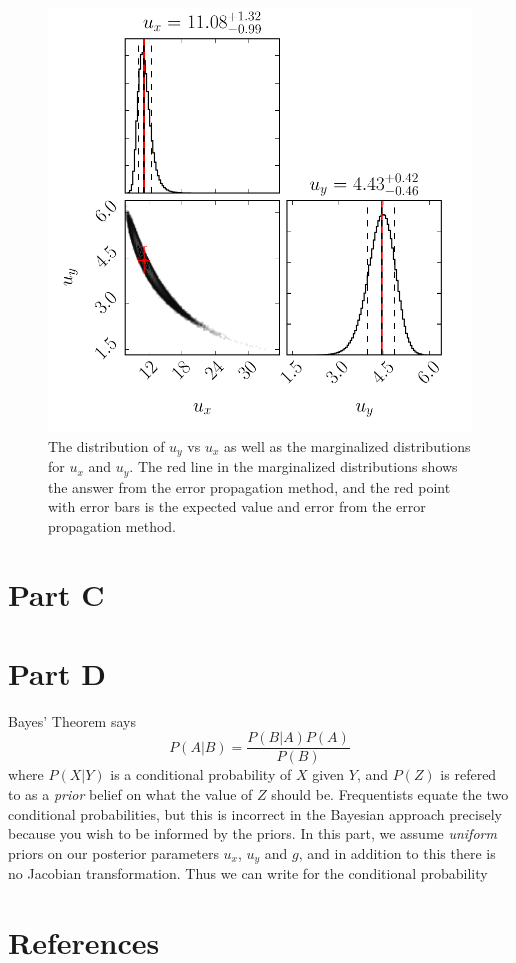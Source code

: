 \documentclass[12pt,a4paper]{article}
\begin{document}
\begin{enumerate}[a)]
 \begin{figure}[ht]
  \centering
  \includegraphics[keepaspectratio]{hw2_b_corner.pdf}
  \caption{The distribution of $u_y$ vs $u_x$ as well as the marginalized distributions for $u_x$ and $u_y$. The red line in the marginalized distributions shows the answer from the error propagation method, and the red point with error bars is the expected value and error from the error propagation method.}
  \label{fig:2.1b}
 \end{figure}
\end{enumerate}

\section{Part C}

\section{Part D}
Bayes' Theorem says
\begin{equation}
  P(A|B) = \frac{P(B|A)P(A)}{P(B)}
\end{equation}
where $P(X|Y)$ is a conditional probability of $X$ given $Y$, and $P(Z)$ is 
refered to as a \textit{prior} belief on what the value of $Z$ should be.
Frequentists equate the two conditional probabilities, but this is incorrect
in the Bayesian approach precisely because you wish to be informed by the 
priors. In this part, we assume \textit{uniform} priors on our posterior
parameters $u_x$, $u_y$ and $g$, and in addition to this there is no Jacobian 
transformation. Thus we can write for the conditional probability
\begin{equation}

\end{equation}

\newpage

\section*{References}
\end{document}
